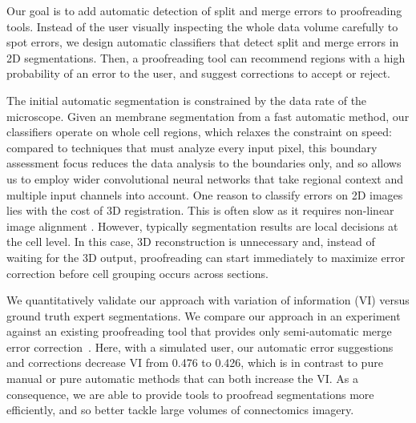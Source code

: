 Our goal is to add automatic detection of split and merge errors to proofreading tools. Instead of the user visually inspecting the whole data volume carefully to spot errors, we design automatic classifiers that detect split and merge errors in 2D segmentations. Then, a proofreading tool can recommend regions with a high probability of an error to the user, and suggest corrections to accept or reject.

The initial automatic segmentation is constrained by the data rate of the microscope. Given an membrane segmentation from a fast automatic method, our classifiers operate on whole cell regions, which relaxes the constraint on speed: compared to techniques that must analyze every input pixel, this boundary assessment focus reduces the data analysis to the boundaries only, and so allows us to employ wider convolutional neural networks that take regional context and multiple input channels into account. One reason to classify errors on 2D images lies with the cost of 3D registration. This is often slow as it requires non-linear image alignment \cite{akselrod09,Saalfeld2010Asrigidaspossible}. However, typically segmentation results are local decisions at the cell level. In this case, 3D reconstruction is unnecessary and, instead of waiting for the 3D output, proofreading can start immediately to maximize error correction before cell grouping occurs across sections.

We quantitatively validate our approach with variation of information (VI) versus ground truth expert segmentations. We compare our approach in an experiment against an existing proofreading tool that provides only semi-automatic merge error correction~\cite{haehn_dojo_2014}. Here, with a simulated user, our automatic error suggestions and corrections decrease VI from 0.476 to 0.426, which is in contrast to pure manual or pure automatic methods that can both increase the VI. As a consequence, we are able to provide tools to proofread segmentations more efficiently, and so better tackle large volumes of connectomics imagery.

%
%
